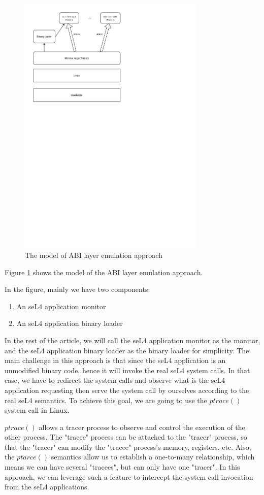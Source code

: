 \begin{figure}[h]
    \centering
    \includegraphics[clip, trim=0.5cm 16cm 8cm 0.5cm, width=0.8\textwidth, height=0.8\textwidth]{ch3/model2-v2.pdf}
    \caption{The model of ABI layer emulation approach}
    \label{fig:mabi}
\end{figure}

Figure \ref{fig:mabi} shows the model of the ABI layer emulation approach.

In the figure, mainly we have two components:

\begin{enumerate}
    \item An seL4 application monitor
    \item An seL4 application binary loader 
\end{enumerate}

In the rest of the article, we will call the seL4 application monitor as the monitor, and the seL4 application binary loader as the binary loader for simplicity. The main challenge in this approach is that since the seL4 application is an unmodified binary code, hence it will invoke the real seL4 system calls. In that case, we have to redirect the system calls and observe what is the seL4 application requesting then serve the system call by ourselves according to the real seL4 semantics. To achieve this goal, we are going to use the $ptrace()$ system call in Linux.

$ptrace()$ allows a tracer process to observe and control the execution of the other process. The "tracee" process can be attached to the "tracer" process, so that the "tracer" can modify the "tracee" process's memory, registers, etc. Also, the $ptarce()$ semantics allow us to establish a one-to-many relationship, which means we can have several "tracees", but can only have one "tracer". In this approach, we can leverage such a feature to intercept the system call invocation from the seL4 applications.

